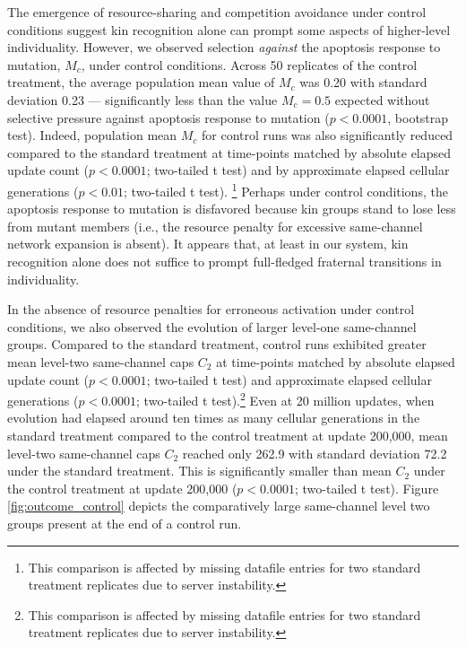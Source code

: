 The emergence of resource-sharing and competition avoidance under control conditions suggest kin recognition alone can prompt some aspects of higher-level individuality.
However, we observed selection \textit{against} the apoptosis response to mutation, $M_{c}$, under control conditions.
Across 50 replicates of the control treatment, the average population mean value of $M_{c}$ was 0.20 with standard deviation 0.23 --- significantly less than the value $M_{c} = 0.5$ expected without selective pressure against apoptosis response to mutation ($p < 0.0001$, bootstrap test).
Indeed, population mean $M_{c}$ for control runs was also significantly reduced compared to the standard treatment at time-points matched by absolute elapsed update count ($p < 0.0001$; two-tailed t test) and by approximate elapsed cellular generations ($p < 0.01$; two-tailed t test).
\footnote{This comparison is affected by missing datafile entries for two standard treatment replicates due to server instability.}
Perhaps under control conditions, the apoptosis response to mutation is disfavored because kin groups stand to lose less from mutant members (i.e., the resource penalty for excessive same-channel network expansion is absent).
It appears that, at least in our system, kin recognition alone does not suffice to prompt full-fledged fraternal transitions in individuality.

In the absence of resource penalties for erroneous activation under control conditions, we also observed the evolution of larger level-one same-channel groups.
Compared to the standard treatment, control runs exhibited greater mean level-two same-channel caps $C_2$ at time-points matched by absolute elapsed update count ($p < 0.0001$; two-tailed t test) and approximate elapsed cellular generations ($p < 0.0001$; two-tailed t test).\footnote{This comparison is affected by missing datafile entries for two standard treatment replicates due to server instability.}
Even at 20 million updates, when evolution had elapsed around ten times as many cellular generations in the standard treatment compared to the control treatment at update 200,000, mean level-two same-channel caps $C_2$ reached only 262.9 with standard deviation 72.2 under the standard treatment.
This is significantly smaller than mean $C_2$ under the control treatment at update 200,000 ($p < 0.0001$; two-tailed t test).
Figure \ref{fig:outcome_control} depicts the comparatively large same-channel level two groups present at the end of a control run.
